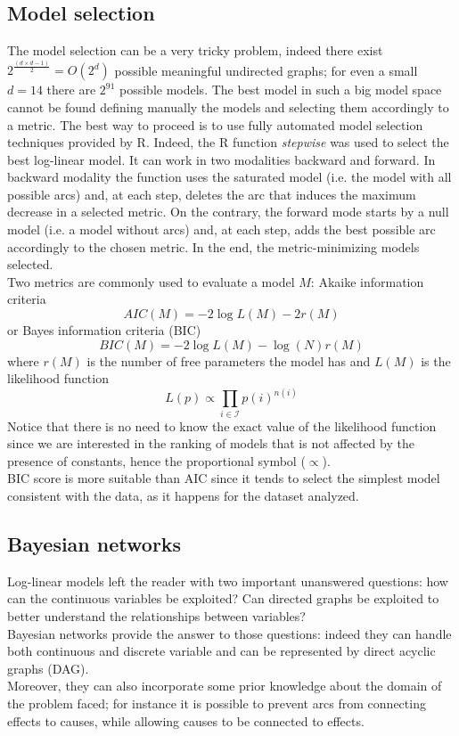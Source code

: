 \documentclass{article}
\begin{document}
\subsection{Model selection}
The model selection can be a very tricky problem, indeed there exist $2^{\frac{(d \times d-1)}{2}} = O(2^{d})$ possible meaningful undirected graphs; for even a small $d = 14$ there are $2^{91}$ possible models. The best model in such a big model space cannot be found defining manually the models and selecting them accordingly to a metric. The best way to proceed is to use fully automated model selection techniques provided by R. Indeed, the R function \textit{stepwise} was used to select the best log-linear model.
It can work in two modalities backward and forward. In backward modality the function uses the saturated model (i.e. the model with all possible arcs) and, at each step, deletes the arc that induces the maximum decrease in a selected metric. On the contrary, the forward mode starts by a null model (i.e. a model without arcs) and, at each step, adds the best possible arc accordingly to the chosen metric. In the end, the metric-minimizing models selected. \\
Two metrics are commonly used to evaluate a model $M$: Akaike information criteria \begin{equation}
   AIC(M) =  -2 \log L(M) -2r(M) 
\end{equation}
or Bayes information criteria (BIC)
\begin{equation}
   BIC(M) =  -2 \log L(M) - \log(N) r(M) 
\end{equation}
where $r(M)$ is the number of free parameters the model has and $L(M)$ is the likelihood function
\begin{equation}
    L(p) \propto  \prod\limits_{i \in \mathcal{I}}p(i)^{n(i)}
\end{equation}
Notice that there is no need to know the exact value of the likelihood function since we are interested in the ranking of models that is not affected by the presence of constants, hence the proportional symbol ($\propto$). \\
BIC score is more suitable than AIC since it tends to select the simplest model consistent with the data, as it happens for the dataset analyzed.


\subsection{Bayesian networks}
Log-linear models left the reader with two important unanswered questions: how can the continuous variables be exploited? Can directed graphs be exploited to better understand the relationships between variables? \\
Bayesian networks provide the answer to those questions: indeed they can handle both continuous and discrete variable and can be represented by direct acyclic graphs (DAG). \\
Moreover, they can also incorporate some prior knowledge about the domain of the problem faced; for instance it is possible to prevent arcs from connecting effects to causes, while allowing causes to be connected to effects.\\
\end{document}
